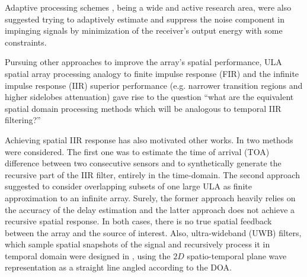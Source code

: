 Adaptive processing schemes \cite{frost1972algorithm,manolakis2000statistical}, being a wide and active  research area, were also suggested trying to adaptively estimate and suppress the noise component in impinging signals by minimization of the receiver's output energy with some constraints.
\par Pursuing other approaches to improve the array's spatial performance, ULA spatial array processing analogy to finite impulse response (FIR) \cite{van1988beamforming} and the infinite impulse response (IIR) superior performance (e.g. narrower transition regions and higher sidelobes attenuation) gave rise to the question ``what are the equivalent spatial domain processing methods which will be analogous to temporal IIR filtering?''
\par Achieving spatial IIR response has also motivated other works.
In \cite{wen2013extending} two methods were considered.
The first one was to estimate the time of arrival (TOA) difference between two consecutive sensors and to synthetically generate the recursive part of the IIR filter, entirely in the time-domain. The second approach suggested to consider overlapping subsets of one large ULA as finite approximation to an infinite array. 
Surely, the former approach heavily relies on the accuracy of the delay estimation and the latter approach does not achieve a recursive spatial response. In both cases, there is no true spatial feedback between the array and the source of interest.
Also, ultra-wideband (UWB) filters, which sample spatial snapshots of the signal and recursively process it in temporal domain were designed in \cite{bruton1983highly}, using the $2D$ spatio-temporal plane wave representation as a straight line angled according to the DOA.
